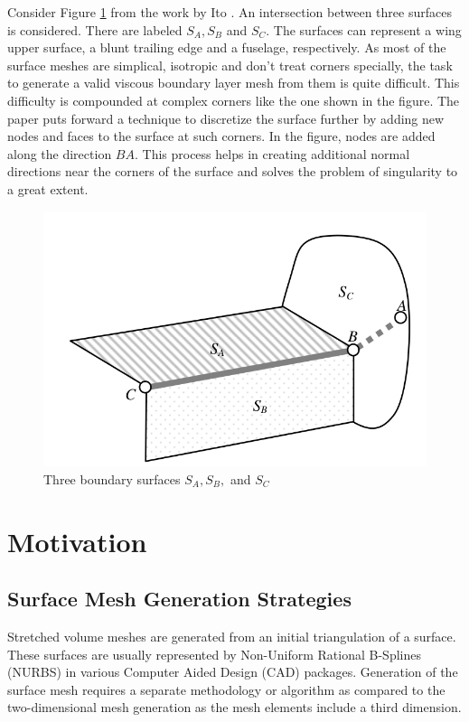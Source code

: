 Consider Figure \ref{fig-cornerIto} from the work by Ito \etal \cite{ito2007multiple}. An intersection between three surfaces is considered. There are labeled $S_A, S_B$ and $S_C$. The surfaces can represent a wing upper surface, a blunt trailing edge and a fuselage, respectively. As most of the surface meshes are simplical, isotropic and don't treat corners specially, the task to generate a valid viscous boundary layer mesh from them is quite difficult. This difficulty is compounded at complex corners like the one shown in the figure. The paper puts forward a technique to discretize the surface further by adding new nodes and faces to the surface at such corners. In the figure, nodes are added along the direction $BA$. This process helps in creating additional normal directions near the corners of the surface and solves the problem of singularity to a great extent.

\begin{figure}
	\centering
	\includegraphics[width=0.8\linewidth]{img/intro/lit/cornerIto.png}
	\caption{Three boundary surfaces $S_A, S_B, $ and $S_C$ \cite{ito2007multiple}}
	\label{fig-cornerIto}
\end{figure}

\section{Motivation}
\label{sec-motivation}

\subsection{Surface Mesh Generation Strategies}

Stretched volume meshes are generated from an initial triangulation of a surface. These surfaces are usually represented by Non-Uniform Rational B-Splines (NURBS) in various Computer Aided Design (CAD) packages. Generation of the surface mesh requires a separate methodology or algorithm as compared to the two-dimensional mesh generation as the mesh elements include a third dimension.

